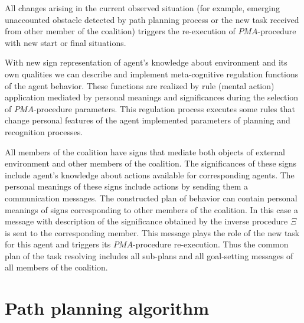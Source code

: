 \documentclass[runningheads,a4paper]{llncs}
\begin{document}
All changes arising in the current observed situation (for example, emerging unaccounted obstacle detected by path planning process or the new task received from other member of the coalition) triggers the re-execution of $PMA$-procedure with new start or final situations.

With new sign representation of agent's knowledge about environment and its own qualities we can describe and implement meta-cognitive regulation functions of the agent behavior. These functions are realized by rule (mental action) application mediated by personal meanings and significances during the selection of $PMA$-procedure parameters. This regulation process executes some rules that change personal features of the agent implemented parameters of planning and recognition processes.

All members of the coalition have signs that mediate both objects of external environment and other members of the coalition. The significances of these signs include agent's knowledge about actions available for corresponding agents. The personal meanings of these signs include actions by sending them a communication messages.
The constructed plan of behavior can contain personal meanings of signs corresponding to other members of the coalition. In this case a message with description of the significance obtained by the inverse procedure $\Xi$ is sent to the corresponding member. This message plays the role of the new task for this agent and triggers its $PMA$-procedure re-execution. Thus the common plan of the task resolving includes all sub-plans and all goal-setting messages of all members of the coalition.

\section{Path planning algorithm}\label{path}
\end{document}
